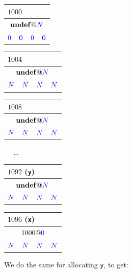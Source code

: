 \documentclass[acmsmall,review,anonymous]{acmart}\settopmatter{printfolios=true,printccs=false,printacmref=false}
\begin{document}
\vspace{\abovedisplayskip}
\begin{tabular}{|c|c|c|c|}
  \multicolumn{4}{l}{\(1000\)} \\
  \hline
  \multicolumn{4}{|c|}{\(\mathbf{undef} @ {\color{blue} N}\)} \\
  \hline
  \({\color{blue} 0}\) & \({\color{blue} 0}\) & \({\color{blue} 0}\) & \({\color{blue} 0}\) \\
  \hline
\end{tabular}\hspace{-2pt}
\begin{tabular}{|c|c|c|c|}
  \multicolumn{4}{l}{\(1004\)} \\
  \hline
  \multicolumn{4}{|c|}{\(\mathbf{undef} @ {\color{blue} N}\)} \\
  \hline
  \footnotesize \({\color{blue} N}\) & \footnotesize \({\color{blue} N}\) & \footnotesize \({\color{blue} N}\) & \footnotesize \({\color{blue} N}\) \\
  \hline
\end{tabular}\hspace{-2pt}
\begin{tabular}{|c|c|c|c|}
  \multicolumn{4}{l}{\(1008\)} \\
  \hline
  \multicolumn{4}{|c|}{\(\mathbf{undef} @ {\color{blue} N}\)} \\
  \hline
  \footnotesize \({\color{blue} N}\) & \footnotesize \({\color{blue} N}\) & \footnotesize \({\color{blue} N}\) & \footnotesize \({\color{blue} N}\) \\
  \hline
\end{tabular}~ ~\dots~ ~
\begin{tabular}{|c|c|c|c|}
  \multicolumn{4}{l}{\(1092\) ({\tt y})} \\
  \hline
  \multicolumn{4}{|c|}{\(\mathbf{undef} @ {\color{blue} N}\)} \\
  \hline
  \footnotesize \({\color{blue} N}\) & \footnotesize \({\color{blue} N}\) & \footnotesize \({\color{blue} N}\) & \footnotesize \({\color{blue} N}\) \\
  \hline
\end{tabular}\hspace{-2pt}
\begin{tabular}{|c|c|c|c|}
  \multicolumn{4}{l}{\(1096\) ({\tt x})} \\
  \hline
  \multicolumn{4}{|c|}{\(1000 @ {\color{blue} 0}\)} \\
  \hline
  \footnotesize \({\color{blue} N}\) & \footnotesize \({\color{blue} N}\) & \footnotesize \({\color{blue} N}\) & \footnotesize \({\color{blue} N}\) \\
  \hline
\end{tabular}

\vspace{\belowdisplayskip}

We do the same for allocating {\tt y}, to get:
\vspace{\abovedisplayskip}
\end{document}
